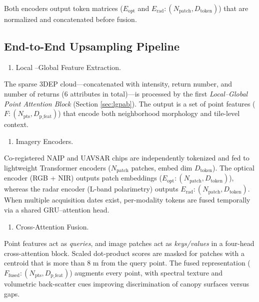 \documentclass[12pt]{report}
\begin{document}
Both encoders output token matrices ($E_{\text{opt}}$ and $E_{\text{rad}}: (N_{\text{patch}}, D_{\text{token}})$) that are normalized and concatenated before fusion.

\newpage

\subsection{End-to-End Upsampling Pipeline}
\label{sec:pipeline}


\begin{enumerate}
\item[(1)] {Local
–Global Feature Extraction.}
\end{enumerate}

The sparse 3DEP cloud—concatenated with intensity, return number, and number of returns (6 attributes in total)—is processed by the first \emph{Local–Global Point Attention Block} (Section \ref{sec:lgpab}). The output is a set of point features ($F: (N_{\text{pts}}, D_{\text{p\_feat}})$) that encode both neighborhood morphology and tile-level context.


\begin{enumerate}
\item[(2)] {Imagery Encoders.}
\end{enumerate}

Co-registered NAIP and UAVSAR chips are independently tokenized and fed to lightweight Transformer encoders ($N_{\text{patch}}$ patches, embed dim $D_{\text{token}}$). The optical encoder (RGB + NIR) outputs patch embeddings ($E_{\text{opt}}: (N_{\text{patch}}, D_{\text{token}})$), whereas the radar encoder (L-band polarimetry) outputs $E_{\text{rad}}: (N_{\text{patch}}, D_{\text{token}})$. When multiple acquisition dates exist, per-modality tokens are fused temporally via a shared GRU–attention head.

\begin{enumerate}
\item[(3)] {Cross-Attention Fusion.}
\end{enumerate}

Point features act as \emph{queries}, and image patches act as \emph{keys/values}
in a four-head cross-attention block.
Scaled dot-product scores are masked for patches with a centroid that is more than 8 m from the query point. The fused representation ($F_{\text{fused}}: (N_{\text{pts}}, D_{\text{p\_feat}})$) augments every point, with spectral texture and volumetric back-scatter cues improving discrimination of canopy surfaces versus gaps.
\end{document}
